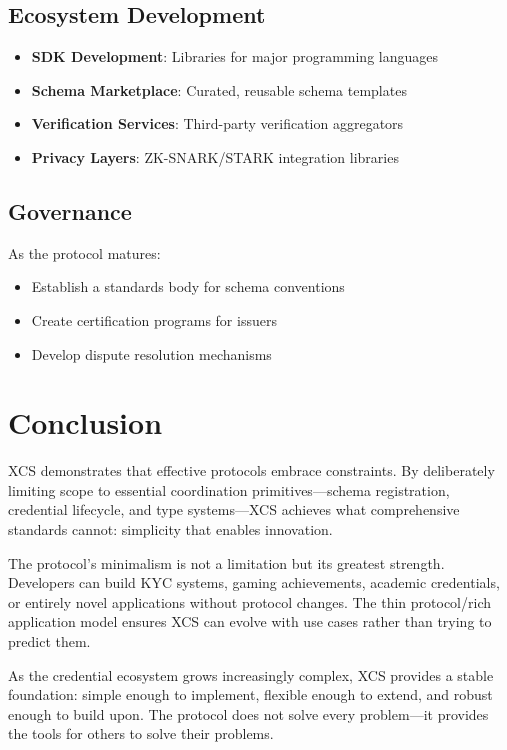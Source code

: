 \documentclass[11pt,a4paper]{article}
\begin{document}
\subsection{Ecosystem Development}

\begin{itemize}
    \item \textbf{SDK Development}: Libraries for major programming languages
    \item \textbf{Schema Marketplace}: Curated, reusable schema templates
    \item \textbf{Verification Services}: Third-party verification aggregators
    \item \textbf{Privacy Layers}: ZK-SNARK/STARK integration libraries
\end{itemize}

\subsection{Governance}

As the protocol matures:
\begin{itemize}
    \item Establish a standards body for schema conventions
    \item Create certification programs for issuers
    \item Develop dispute resolution mechanisms
\end{itemize}

\section{Conclusion}

XCS demonstrates that effective protocols embrace constraints. By deliberately limiting scope to essential coordination primitives—schema registration, credential lifecycle, and type systems—XCS achieves what comprehensive standards cannot: simplicity that enables innovation.

The protocol's minimalism is not a limitation but its greatest strength. Developers can build KYC systems, gaming achievements, academic credentials, or entirely novel applications without protocol changes. The thin protocol/rich application model ensures XCS can evolve with use cases rather than trying to predict them.

As the credential ecosystem grows increasingly complex, XCS provides a stable foundation: simple enough to implement, flexible enough to extend, and robust enough to build upon. The protocol does not solve every problem—it provides the tools for others to solve their problems.
\end{document}
